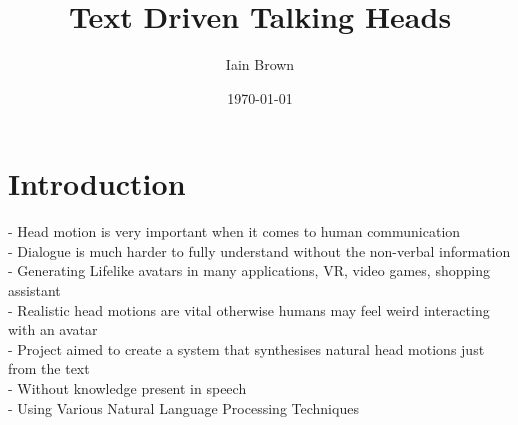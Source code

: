 \documentclass[bsc,frontabs,twoside,singlespacing,parskip]{infthesis}
\begin{document}
\title{Text Driven Talking Heads}

\author{Iain Brown}

\date{\today}
\maketitle
\tableofcontents

\chapter{Introduction}

%

- Head motion is very important when it comes to human communication \\
- Dialogue is much harder to fully understand without the non-verbal information \\
- Generating Lifelike avatars in many applications, VR, video games, shopping assistant \\
- Realistic head motions are vital otherwise humans may feel weird interacting with an avatar \\
- Project aimed to create a system that synthesises natural head motions just from the text \\
- Without knowledge present in speech \\
- Using Various Natural Language Processing Techniques \\
\end{document}
